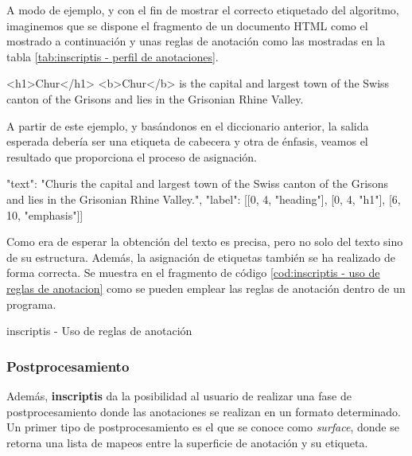 A modo de ejemplo, y con el fin de mostrar el correcto etiquetado del algoritmo, imaginemos que se dispone 
el fragmento de un documento HTML como el mostrado a continuación y unas reglas de anotación como las 
mostradas en la tabla \ref{tab:inscriptis - perfil de anotaciones}.

\begin{Schunk}
  \begin{Soutput}
    <h1>Chur</h1>
    <b>Chur</b> is the capital and largest town of the Swiss 
    canton of the Grisons and lies in the Grisonian Rhine Valley.
  \end{Soutput}
\end{Schunk}

A partir de este ejemplo, y basándonos en el diccionario anterior, la salida esperada debería ser una 
etiqueta de cabecera y otra de énfasis, veamos el resultado que proporciona el proceso de asignación.

\begin{Schunk}
  \begin{Soutput}
    {
      "text": "Chur\n\nChur is the capital and largest town of the Swiss 
              canton of the Grisons and lies in the Grisonian Rhine Valley.",
      "label": [[0, 4, "heading"], [0, 4, "h1"], [6, 10, "emphasis"]]
    }
  \end{Soutput}
\end{Schunk}

Como era de esperar la obtención del texto es precisa, pero no solo del texto sino de su estructura. Además,
la asignación de etiquetas también se ha realizado de forma correcta. Se muestra en el fragmento de código
\ref{cod:inscriptis - uso de reglas de anotacion} como se pueden emplear las reglas de anotación dentro de 
un programa.

\begin{codefloat}
  
  \caption{inscriptis - Uso de reglas de anotación}
  \label{cod:inscriptis - uso de reglas de anotacion}
\end{codefloat}

\subsubsection{Postprocesamiento}
\label{subsubsec:postprocesamiento}

Además, \textbf{inscriptis} da la posibilidad al usuario de realizar una fase de postprocesamiento donde 
las anotaciones se realizan en un formato determinado. Un primer tipo de postprocesamiento es el que se 
conoce como \emph{surface}, donde se retorna una lista de mapeos entre la superficie de anotación y su 
etiqueta.

